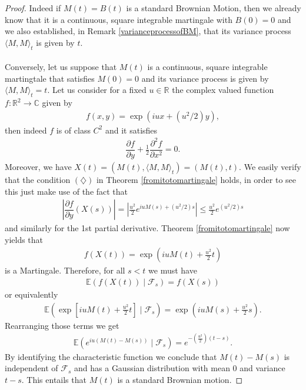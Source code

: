 \documentclass[11pt,a4paper, final]{article}
\begin{document}
\begin{proof}
Indeed if $M(t)=B(t)$ is a standard Brownian Motion, then we already know that it is a continuous, square integrable martingale with $B(0)=0$ and we also established, in Remark \ref{varianceprocessofBM}, that its variance process $\langle M, M \rangle_t$ is given by $t$.
\\\\
Conversely, let us suppose that $M(t)$ is a continuous, square integrable martingtale that satisfies $M(0)=0$ and its variance process is given by $\langle M, M \rangle_t =t$.  Let us consider for a fixed $u \in \mathbb{R}$ the complex valued function $f: \mathbb{R}^2 \to \mathbb{C}$ given by 
\begin{align*}
f(x,y)= \exp ( iux+(u^2/2)y),
\end{align*}
then indeed $f$ is of class $C^2$ and it satisfies 
\begin{align*}
\dfrac{\partial f}{\partial y} + \frac{1}{2} \dfrac{\partial^2f}{\partial x^2}=0.
\end{align*}
Moreover, we have $X(t)=(M(t), \langle M, M \rangle_t ) = (M(t), t)$. We easily verify that the condition $(\diamondsuit)$ in Theorem \ref{fromitotomartingale} holds, in order to see this just make use of the fact that 
\begin{align*}
\left| \dfrac{\partial f}{\partial y}(X(s)) \right|
= \left| \frac{u^2}{2} e^{iu M(s) + (u^2/2)s} \right| \leq \frac{u^2}{2} e^{(u^2/2)s}
\end{align*} 
and similarly for the 1st partial derivative. Theorem \ref{fromitotomartingale} now yields that  
\begin{align*}
f(X(t)) = \exp \left( i u M(t) + \frac{u^2}{2}t \right) 
\end{align*}
is a Martingale. Therefore, for all $s <t$ we must have 
\begin{align*}
\mathbb{E}(f(X(t)) \mid \mathcal{F}_s) = f(X(s))
\end{align*}
or equivalently 
\begin{align*}
\mathbb{E}\left( \exp \left[ i u M(t) + \frac{u^2}{2}t \right] \mid \mathcal{F}_s \right) = \exp \left( i u M(s) + \frac{u^2}{2}s \right). 
\end{align*}
Rearranging those terms we get 
\begin{align*}
\mathbb{E} \left( e^{iu(M(t)-M(s))} \mid \mathcal{F}_s \right) = e^{- \left( \frac{u^2}{2} \right)(t-s)}.
\end{align*}
By identifying the characteristic function we conclude that $M(t)-M(s)$ is independent of $\mathcal{F}_s$ and has a Gaussian distribution with mean $0$ and variance $t-s$. This entails that $M(t)$ is a standard Brownian motion. 
\end{proof}
\newpage
\end{document}
